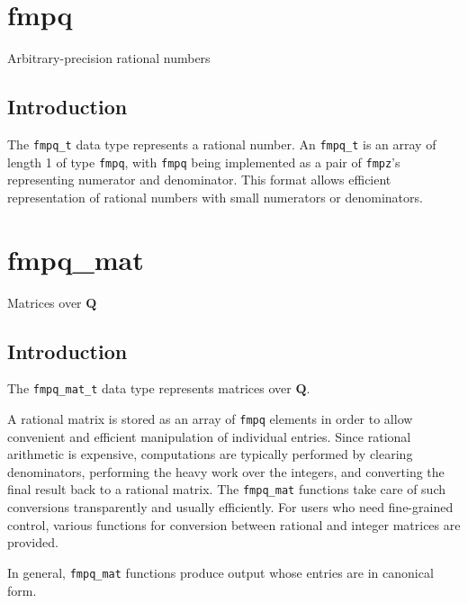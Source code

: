 \documentclass[a4paper,10pt]{book}
\newcommand{\Q}{\mathbf{Q}}%
\newcommand{\code}{\lstinline}
\begin{document}
\chapter{fmpq}
\epigraph{Arbitrary-precision rational numbers}{}

\section{Introduction}

The \code{fmpq_t} data type represents a rational number. An \code{fmpq_t}
is an array of length 1 of type \code{fmpq}, with \code{fmpq} being
implemented as a pair of \code{fmpz}'s representing numerator and
denominator. This format allows efficient representation of rational
numbers with small numerators or denominators.





\chapter{fmpq\_mat}
\epigraph{Matrices over $\Q$}{}

\section{Introduction}

The \code{fmpq_mat_t} data type represents matrices over $\Q$.

A rational matrix is stored as an array of \code{fmpq} elements in order
to allow convenient and efficient manipulation of individual entries.
Since rational arithmetic is expensive, computations are typically performed
by clearing denominators, performing the heavy work over the integers,
and converting the final result back to a rational matrix. The
\code{fmpq_mat} functions take care of such conversions transparently
and usually efficiently. For users who need fine-grained control, various
functions for conversion between rational and integer matrices are provided.

In general, \code{fmpq_mat} functions produce output whose entries
are in canonical form.


\end{document}
